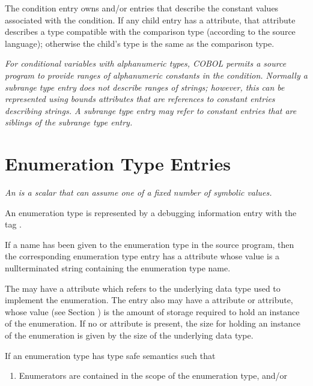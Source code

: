{%
The condition entry owns \DWTAGconstant{} and/or
\DWTAGsubrangetype{} entries that describe the constant
values associated with the condition. If any child entry 
has a \DWATtype{} attribute, that attribute describes
a type compatible with the comparison type (according to the 
source language); otherwise the child\textquoteright{}s type 
is the same as the comparison type.

\textit{For conditional variables with alphanumeric types, COBOL
permits a source program to provide ranges of alphanumeric
constants in the condition. Normally a subrange type entry
does not describe ranges of strings; however, this can be
represented using bounds attributes that are references to
constant entries describing strings. A subrange type entry may
refer to constant entries that are siblings of the subrange
type entry.}


\section{Enumeration Type Entries}
\label{chap:enumerationtypeentries}

\textit{An  is a scalar that can assume one of
a fixed number of symbolic values.}

An enumeration type is represented by a debugging information
entry with the tag 
\DWTAGenumerationtypeTARG.

If a name has been given to the enumeration type in the source
program, then the corresponding enumeration type entry has
a \DWATname{} attribute
whose value is a null\dash terminated
string containing the enumeration type name.

The 
may have 
a \DWATtype{} attribute
which refers to the underlying data type used to implement
the enumeration. The entry also may have a
\DWATbytesize{} attribute or 
\DWATbitsize{}
attribute, whose value 
(see Section ) 
is the amount of storage 
required to hold an instance of the enumeration. If no 
\DWATbytesize{} or \DWATbitsize{}
attribute is present, the size for holding an instance of the 
enumeration is given by the size of the underlying data type.

If an enumeration type has type safe 
semantics such that

\begin{enumerate}[1. ]
\item Enumerators are contained in the scope of the enumeration type, and/or


\end{enumerate}}
